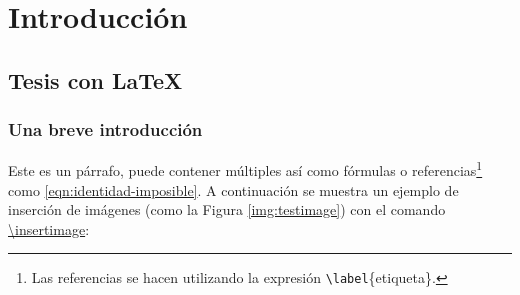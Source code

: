 %
%

\chapter{Introducción}

\section{Tesis con \LaTeX}

\lipsum[4]

\subsection{Una breve introducción}
	
	Este es un párrafo, puede contener múltiples  así como fórmulas o referencias\footnote{Las referencias se hacen utilizando la expresión \texttt{\textbackslash label}\{etiqueta\}.} como \eqref{eqn:identidad-imposible}. A continuación se muestra un ejemplo de inserción de imágenes (como la Figura \ref{img:testimage}) con el comando \href{https://latex.ppizarror.com/informe.html#hlp-imagen}{\textbackslash insertimage}:

		
